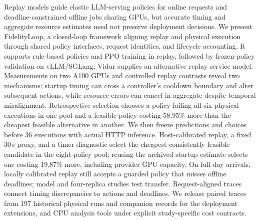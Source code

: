 Replay models guide elastic LLM-serving policies for online requests and deadline-constrained offline jobs sharing GPUs, but accurate timing and aggregate resource estimates need not preserve deployment decisions. We present FidelityLoop, a closed-loop framework aligning replay and physical execution through shared policy interfaces, request identities, and lifecycle accounting. It supports rule-based policies and PPO training in replay, followed by frozen-policy validation on vLLM/SGLang; Vidur supplies an alternative replay service model. Measurements on two A100 GPUs and controlled replay contrasts reveal two mechanisms: startup timing can cross a controller's cooldown boundary and alter subsequent actions, while resource errors can cancel in aggregate despite temporal misalignment. Retrospective selection chooses a policy failing all six physical executions in one pool and a feasible policy costing 58.95\% more than the cheapest feasible alternative in another. We then freeze predictions and choices before 36 executions with actual HTTP inference. Host-calibrated replay, a fixed 30\,s proxy, and a timer diagnostic select the cheapest consistently feasible candidate in the eight-policy pool; reusing the archived startup estimate selects one costing 19.87\% more, including provider GPU capacity. On full-day arrivals, locally calibrated replay still accepts a guarded policy that misses offline deadlines; model and four-replica studies test transfer. Request-aligned traces connect timing discrepancies to actions and deadlines. We release paired traces from 197 historical physical runs and companion records for the deployment extensions, and CPU analysis tools under explicit study-specific cost contracts.
